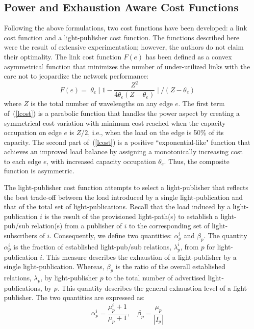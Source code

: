 \documentclass[journal]{IEEEtran}
\begin{document}
\subsection{Power and Exhaustion Aware Cost Functions}\label{costfun}
Following the above formulations, two cost functions have been
developed: a link cost function and a light-publisher cost
function.
The functions described here were the result of extensive
experimentation; however, the authors do not claim their optimality.
The link cost function $F(e)$ has been defined as a convex asymmetrical function that minimizes the number of under-utilized links with the care not to jeopardize the network performance:
\begin{equation}
F(e) = \; \theta_e \mid 1 - \frac{Z^2}{ 4\theta_e(Z-\theta_e)} \mid / (Z-\theta_e)  \label{lcost}
\end{equation}
where $Z$ is the total number of wavelengths on any edge $e$. The first term of~(\ref{lcost}) is a parabolic function that handles the power aspect by creating a symmetrical cost variation with minimum cost reached when the capacity occupation on edge $e$ is $Z/2$, i.e., when the load on the edge is 50\% of its capacity. The second part of~(\ref{lcost}) is a positive ``exponential-like" function that achieves an improved load balance by assigning a monotonically increasing cost to each edge $e$, with increased capacity occupation $\theta_e$. Thus, the composite function is asymmetric. 

The light-publisher cost function attempts to select a light-publisher that reflects the best trade-off between the load introduced by a single light-publication and that of the total set of light-publications. Recall that the load induced by a light-publication $i$ is the result of the provisioned light-path(s) to establish a light-pub/sub relation(s) from a publisher of $i$ to the corresponding set of light-subscribers of $i$.
Consequently, we define two quantities: $\alpha_p^i$ and $\beta_p$. The quantity $\alpha_p^i$ is the fraction of established light-pub/sub relations, $\lambda_p^i$, from $p$ for light-publication $i$. This measure describes the exhaustion of a light-publisher by a single light-publication. Whereas, $\beta_p$ is the ratio of the overall established relations, $\lambda_p$, by light-publisher $p$ to the total number of advertised light-publications, by $p$. This quantity describes the general exhaustion level of a light-publisher. The two quantities are expressed as:
\begin{equation}
\alpha_p^i = \frac{\mu_p^i + 1}{\mu_p+ 1} ,\label{eq:alpha}
\quad
\beta_p  =  \frac{\mu_p}{|I_p|}
\end{equation}
\end{document}
